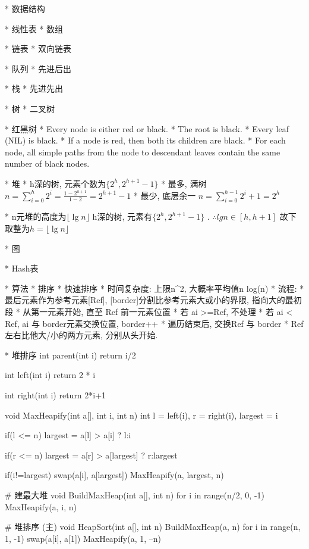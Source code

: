 
* 数据结构

	* 线性表
		* 数组

		* 链表
			* 双向链表

		* 队列
			* 先进后出

		* 栈
			* 先进先出

	* 树
		* 二叉树

		* 红黑树
			\Property
				* Every node is either red or black.
				* The root is black.
				* Every leaf (NIL) is black.
				* If a node is red, then both its children are black.
				* For each node, all simple paths from the node to descendant leaves contain the same number of black nodes.

		* 堆
			\Property
				* h深的树, 元素个数为$\{ 2^h, 2^{h+1} - 1 \}$ 
					\Proof
						* 最多, 满树
						$n = \sum_{i=0}^h 2^i = \frac{1 - 2^{h+1}}{1 - 2} = 2^{h+1} - 1$
						* 最少, 底层余一
						$n = \sum_{i=0}^{h-1} 2^i + 1 = 2^h$

				* n元堆的高度为$⌊\lg n⌋$
					\Proof
						h深的树, 元素有$\{ 2^h, 2^{h+1} - 1 \}$
						. $∴ lg n \in [h, h + 1]$
						故下取整为$ h = ⌊\lg n⌋$

	* 图

	* Hash表

* 算法
	* 排序
		* 快速排序
			\Property
				* 时间复杂度: 上限n^2, 大概率平均值n log(n)
				* 流程: 
					* 最后元素作为参考元素[Ref], [border]分割比参考元素大或小的界限, 指向大的最初段
					* 从第一元素开始, 直至 Ref 前一元素位置
						* 若 ai >=Ref, 不处理
						* 若 ai < Ref, ai 与 border元素交换位置, border++
					* 遍历结束后, 交换Ref 与 border
					* Ref 左右比他大/小的两方元素, 分别从头开始. 
			
		* 堆排序
			\Codes
				int parent(int i)
					return i/2

				int left(int i)
					return 2 * i

				int right(int i)
					return 2*i+1

				void MaxHeapify(int a[], int i, int n)
					int l = left(i), r = right(i), largest = i

					if(l <= n)
						largest = a[l] > a[i] ? l:i

					if(r <= n)
						largest = a[r] > a[largest] ? r:largest

					if(i!=largest)
						swap(a[i], a[largest])
						MaxHeapify(a, largest, n)

				# 建最大堆
				void BuildMaxHeap(int a[], int n)
					for i in range(n/2, 0, -1)
						MaxHeapify(a, i, n)

				# 堆排序 (主)
				void HeapSort(int a[], int n)
					BuildMaxHeap(a, n)
					for i in range(n, 1, -1)
						swap(a[i], a[1])
						MaxHeapify(a, 1, --n)

